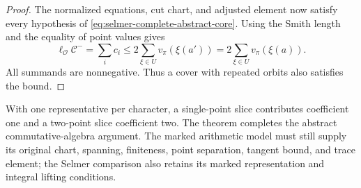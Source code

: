 \begin{proof}
The normalized equations, cut chart, and adjusted element now
satisfy every hypothesis of \eqref{eq:selmer-complete-abstract-core}.
Using the Smith length and the equality of point values gives
\[
 \ell_{\mathcal O}\mathcal C^-=\sum_i c_i
 \le2\sum_{\xi\in U}v_\pi(\xi(a'))
 =2\sum_{\xi\in U}v_\pi(\xi(a)).
\]
All summands are nonnegative. Thus a cover with repeated orbits also
satisfies the bound.
\end{proof}

With one representative per character, a single-point slice contributes
coefficient one and a two-point slice coefficient two. The theorem
completes the abstract commutative-algebra argument. The marked
arithmetic model must still supply its original chart, spanning,
finiteness, point separation, tangent bound, and trace element; the
Selmer comparison also retains its marked representation and integral
lifting conditions.
